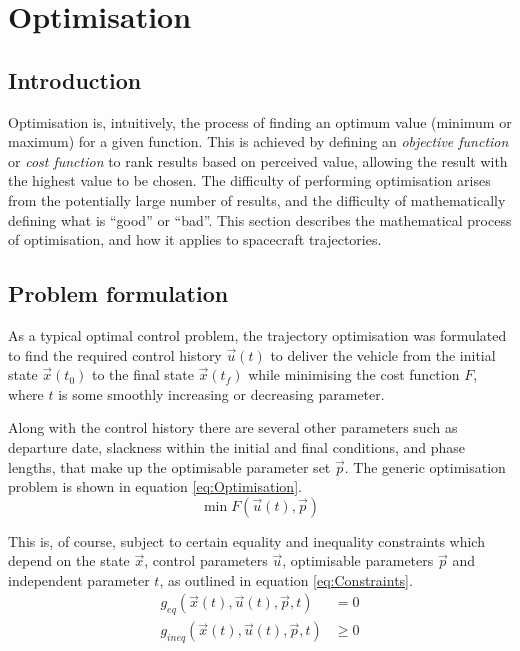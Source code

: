 \chapter{Optimisation} \label{cha:Optimisation}
\section{Introduction} \label{sec:Optimisation-Introduction}

Optimisation is, intuitively, the process of finding an optimum value (minimum or maximum) for a given function. This is achieved by defining an \emph{objective function} or \emph{cost function} to rank results based on perceived value, allowing the result with the highest value to be chosen. The difficulty of performing optimisation arises from the potentially large number of results, and the difficulty of mathematically defining what is \enquote{good} or \enquote{bad}. This section describes the mathematical process of optimisation, and how it applies to spacecraft trajectories.

\section{Problem formulation} \label{sec:Formulation}

As a typical optimal control problem, the trajectory optimisation was formulated to find the required control history $\vec{u}(t)$ to deliver the vehicle from the initial state $\vec{x}(t_0)$ to the final state $\vec{x}(t_f)$ while minimising the cost function $F$, where $t$ is some smoothly increasing or decreasing parameter. 

Along with the control history there are several other parameters such as departure date, slackness within the initial and final conditions, and phase lengths, that make up the optimisable parameter set $\vec{p}$. The generic optimisation problem is shown in equation \eqref{eq:Optimisation}.
\begin{equation} \label{eq:Optimisation}
\min F(\vec{u}(t),\vec{p})
\end{equation}

This is, of course, subject to certain equality and inequality constraints which depend on the state $\vec{x}$, control parameters $\vec{u}$, optimisable parameters $\vec{p}$ and independent parameter $t$, as outlined in equation \eqref{eq:Constraints}.
\begin{subequations} \label{eq:Constraints}
\begin{align}
g_{eq}(\vec{x}(t),\vec{u}(t),\vec{p},t) &= 0 \\
g_{ineq}(\vec{x}(t),\vec{u}(t),\vec{p},t) &\ge 0 
\end{align}
\end{subequations}

